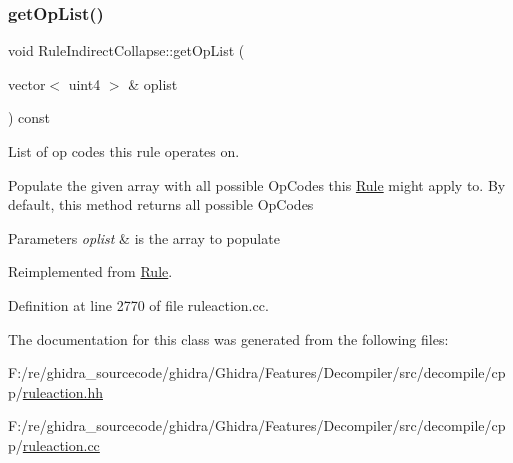 \subsubsection{\texorpdfstring{getOpList()}{getOpList()}}
{\footnotesize\ttfamily void Rule\+Indirect\+Collapse\+::get\+Op\+List (\begin{DoxyParamCaption}\item[{vector$<$ uint4 $>$ \&}]{oplist }\end{DoxyParamCaption}) const\hspace{0.3cm}{\ttfamily [virtual]}}



List of op codes this rule operates on. 

Populate the given array with all possible Op\+Codes this \mbox{\hyperlink{class_rule}{Rule}} might apply to. By default, this method returns all possible Op\+Codes 
\begin{DoxyParams}{Parameters}
{\em oplist} & is the array to populate \\
\hline
\end{DoxyParams}


Reimplemented from \mbox{\hyperlink{class_rule_a4023bfc7825de0ab866790551856d10e}{Rule}}.



Definition at line 2770 of file ruleaction.\+cc.



The documentation for this class was generated from the following files\+:\begin{DoxyCompactItemize}
\item 
F\+:/re/ghidra\+\_\+sourcecode/ghidra/\+Ghidra/\+Features/\+Decompiler/src/decompile/cpp/\mbox{\hyperlink{ruleaction_8hh}{ruleaction.\+hh}}\item 
F\+:/re/ghidra\+\_\+sourcecode/ghidra/\+Ghidra/\+Features/\+Decompiler/src/decompile/cpp/\mbox{\hyperlink{ruleaction_8cc}{ruleaction.\+cc}}\end{DoxyCompactItemize}
